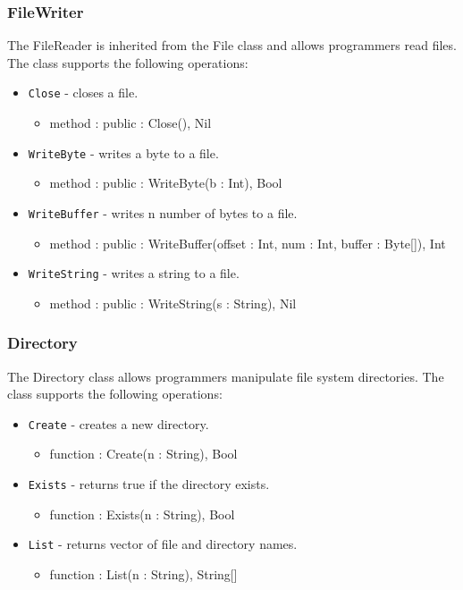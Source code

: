 \documentclass[12pt]{article}
\begin{document}
\subsubsection{FileWriter}
The FileReader is inherited from the File class and allows programmers read files.    The class supports the following operations:
\begin{itemize}
    \item \texttt{Close} - closes a file.
    	\begin{itemize}
	\item method : public : Close(), Nil
	\end{itemize}
    \item \texttt{WriteByte} - writes a byte to a file.
    	\begin{itemize}
	\item method : public : WriteByte(b : Int), Bool
	\end{itemize}
    \item \texttt{WriteBuffer} - writes n number of bytes to a file.
    	\begin{itemize}
	\item method : public : WriteBuffer(offset : Int, num : Int, buffer : Byte[]), Int
	\end{itemize}
    \item \texttt{WriteString} - writes a string to a file.
    	\begin{itemize}
	\item method : public : WriteString(s : String), Nil
	\end{itemize}
\end{itemize}

\subsubsection{Directory}
The Directory class allows programmers manipulate file system directories.    The class supports the following operations:
\begin{itemize}
    \item \texttt{Create} - creates a new directory.
    	\begin{itemize}
	\item function : Create(n : String), Bool
	\end{itemize}
    \item \texttt{Exists} - returns true if the directory exists.
    	\begin{itemize}
	\item function : Exists(n : String), Bool
	\end{itemize}
    \item \texttt{List} - returns vector of file and directory names.
    	\begin{itemize}
	\item function : List(n : String), String[]
	\end{itemize}
\end{itemize}
\end{document}
